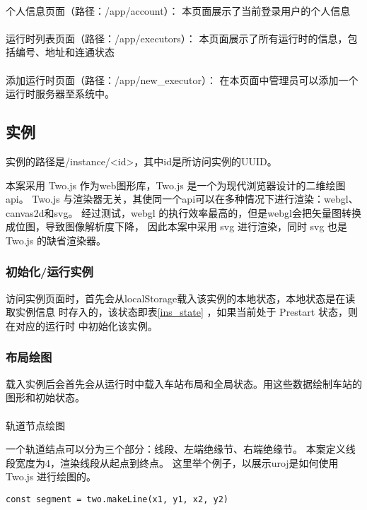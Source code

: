 \paragraph{} 个人信息页面（路径：/app/account）：
本页面展示了当前登录用户的个人信息

\paragraph{} 运行时列表页面（路径：/app/executors）：
本页面展示了所有运行时的信息，包括编号、地址和连通状态

\paragraph{} 添加运行时页面（路径：/app/new\_executor）：
在本页面中管理员可以添加一个运行时服务器至系统中。

\subsection{实例}
实例的路径是/instance/<id>，其中id是所访问实例的UUID。

本案采用 Two.js 作为web图形库，Two.js 是一个为现代浏览器设计的二维绘图api。
Two.js 与渲染器无关，其使同一个api可以在多种情况下进行渲染：webgl、canvas2d和svg\cite{twojs}。
经过测试，webgl 的执行效率最高的，但是webgl会把矢量图转换成位图，导致图像解析度下降，
因此本案中采用 svg 进行渲染，同时 svg 也是 Two.js 的缺省渲染器。

\subsubsection{初始化/运行实例}
访问实例页面时，首先会从localStorage载入该实例的本地状态，本地状态是在读取实例信息
时存入的，该状态即表\ref{ins_state} ，如果当前处于 Prestart 状态，则在对应的运行时
中初始化该实例。

\subsubsection{布局绘图}

载入实例后会首先会从运行时中载入车站布局和全局状态。用这些数据绘制车站的图形和初始状态。

\paragraph{}轨道节点绘图

一个轨道结点可以分为三个部分：线段、左端绝缘节、右端绝缘节。
本案定义线段宽度为4，渲染线段从起点到终点。
这里举个例子，以展示uroj是如何使用Two.js 进行绘图的。
\begin{lstlisting}
const segment = two.makeLine(x1, y1, x2, y2)
\end{lstlisting}

